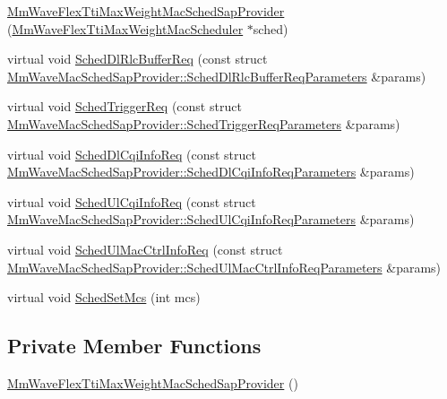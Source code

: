 \begin{DoxyCompactItemize}
\item 
\hyperlink{classns3_1_1MmWaveFlexTtiMaxWeightMacSchedSapProvider_a56f2b4c42fa7afb2618040b1893aebb1}{Mm\+Wave\+Flex\+Tti\+Max\+Weight\+Mac\+Sched\+Sap\+Provider} (\hyperlink{classns3_1_1MmWaveFlexTtiMaxWeightMacScheduler}{Mm\+Wave\+Flex\+Tti\+Max\+Weight\+Mac\+Scheduler} $\ast$sched)
\item 
virtual void \hyperlink{classns3_1_1MmWaveFlexTtiMaxWeightMacSchedSapProvider_a48e103156cfadef4c538159366f86e55}{Sched\+Dl\+Rlc\+Buffer\+Req} (const struct \hyperlink{structns3_1_1MmWaveMacSchedSapProvider_1_1SchedDlRlcBufferReqParameters}{Mm\+Wave\+Mac\+Sched\+Sap\+Provider\+::\+Sched\+Dl\+Rlc\+Buffer\+Req\+Parameters} \&params)
\item 
virtual void \hyperlink{classns3_1_1MmWaveFlexTtiMaxWeightMacSchedSapProvider_ad63ad0f1f04ac4b7ef63cbcdd557d524}{Sched\+Trigger\+Req} (const struct \hyperlink{structns3_1_1MmWaveMacSchedSapProvider_1_1SchedTriggerReqParameters}{Mm\+Wave\+Mac\+Sched\+Sap\+Provider\+::\+Sched\+Trigger\+Req\+Parameters} \&params)
\item 
virtual void \hyperlink{classns3_1_1MmWaveFlexTtiMaxWeightMacSchedSapProvider_a367461feac114e0bfd0556749b4d8a82}{Sched\+Dl\+Cqi\+Info\+Req} (const struct \hyperlink{structns3_1_1MmWaveMacSchedSapProvider_1_1SchedDlCqiInfoReqParameters}{Mm\+Wave\+Mac\+Sched\+Sap\+Provider\+::\+Sched\+Dl\+Cqi\+Info\+Req\+Parameters} \&params)
\item 
virtual void \hyperlink{classns3_1_1MmWaveFlexTtiMaxWeightMacSchedSapProvider_a2c2a627f7e4531d0990bd27e58f36670}{Sched\+Ul\+Cqi\+Info\+Req} (const struct \hyperlink{structns3_1_1MmWaveMacSchedSapProvider_1_1SchedUlCqiInfoReqParameters}{Mm\+Wave\+Mac\+Sched\+Sap\+Provider\+::\+Sched\+Ul\+Cqi\+Info\+Req\+Parameters} \&params)
\item 
virtual void \hyperlink{classns3_1_1MmWaveFlexTtiMaxWeightMacSchedSapProvider_a0a2d6089d872cd7e0d254a062d3d3e51}{Sched\+Ul\+Mac\+Ctrl\+Info\+Req} (const struct \hyperlink{structns3_1_1MmWaveMacSchedSapProvider_1_1SchedUlMacCtrlInfoReqParameters}{Mm\+Wave\+Mac\+Sched\+Sap\+Provider\+::\+Sched\+Ul\+Mac\+Ctrl\+Info\+Req\+Parameters} \&params)
\item 
virtual void \hyperlink{classns3_1_1MmWaveFlexTtiMaxWeightMacSchedSapProvider_aaa4fae414086bc581bf96b87da1b4555}{Sched\+Set\+Mcs} (int mcs)
\end{DoxyCompactItemize}
\subsection*{Private Member Functions}
\begin{DoxyCompactItemize}
\item 
\hyperlink{classns3_1_1MmWaveFlexTtiMaxWeightMacSchedSapProvider_ace10e2de00a1bff4e1b9dde6552d04a5}{Mm\+Wave\+Flex\+Tti\+Max\+Weight\+Mac\+Sched\+Sap\+Provider} ()
\end{DoxyCompactItemize}
